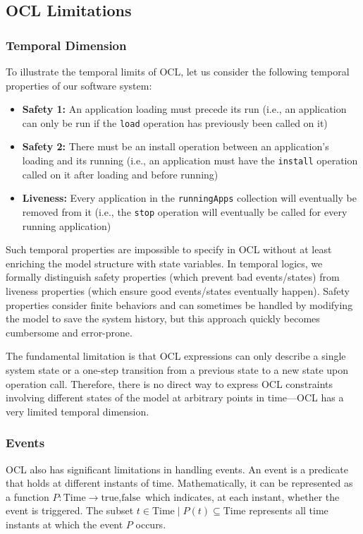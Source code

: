 \subsection{OCL Limitations}

\subsubsection{Temporal Dimension}
To illustrate the temporal limits of OCL, let us consider the following temporal properties of our software system: 

\begin{itemize} 
    \item \textbf{Safety 1:} An application loading must precede its run (i.e., an 
    application can only be run if the \texttt{load} operation has previously been 
    called on it) 
    \item \textbf{Safety 2:} There must be an install operation between an 
    application's loading and its running (i.e., an application must have the 
    \texttt{install} operation called on it after loading and before running) 
    \item \textbf{Liveness:} Every application in the \texttt{runningApps} collection 
    will eventually be removed from it (i.e., the \texttt{stop} operation will 
    eventually be called for every running application) 
\end{itemize}

Such temporal properties are impossible to specify in OCL without at least enriching 
the model structure with state variables. In temporal logics, we formally distinguish 
safety properties (which prevent bad events/states) from liveness properties (which 
ensure good events/states eventually happen). Safety properties consider finite 
behaviors and can sometimes be handled by modifying the model to save the system 
history, but this approach quickly becomes cumbersome and error-prone.

The fundamental limitation is that OCL expressions can only describe a single system 
state or a one-step transition from a previous state to a new state upon operation 
call. Therefore, there is no direct way to express OCL constraints involving different 
states of the model at arbitrary points in time—OCL has a very limited temporal 
dimension.

\subsubsection{Events}
OCL also has significant limitations in handling events. An event is a predicate that 
holds at different instants of time. Mathematically, it can be represented as a 
function 
$P : \text{Time} \rightarrow {\text{true}, \text{false}}$ 
which indicates, at each instant, whether the event is triggered. The subset 
${t \in \text{Time} \mid P(t)} \subseteq \text{Time}$ 
represents all time instants at which the event $P$ occurs.

